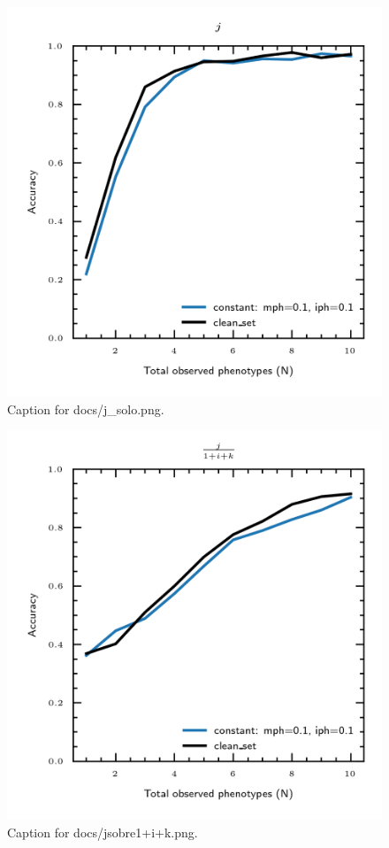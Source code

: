 \documentclass{article}
\begin{document}
\begin{figure}[h] \centering \includegraphics{docs/j_solo.png} \caption{Caption for docs/j_solo.png.} \end{figure}
\begin{figure}[h] \centering \includegraphics{docs/jsobre1+i+k.png} \caption{Caption for docs/jsobre1+i+k.png.} \end{figure}
\end{document}
